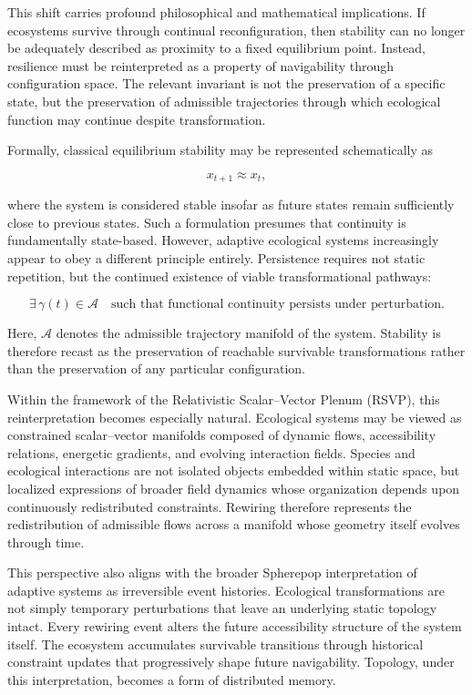 \documentclass[11pt,a4paper]{article}
\newcommand{\Aspace}{\mathcal{A}}
\begin{document}
This shift carries profound philosophical and mathematical implications. If ecosystems survive through continual reconfiguration, then stability can no longer be adequately described as proximity to a fixed equilibrium point. Instead, resilience must be reinterpreted as a property of navigability through configuration space. The relevant invariant is not the preservation of a specific state, but the preservation of admissible trajectories through which ecological function may continue despite transformation.

Formally, classical equilibrium stability may be represented schematically as

\begin{equation}
x_{t+1} \approx x_t, \label{eq:fixedpoint}
\end{equation}

where the system is considered stable insofar as future states remain sufficiently close to previous states. Such a formulation presumes that continuity is fundamentally state-based. However, adaptive ecological systems increasingly appear to obey a different principle entirely. Persistence requires not static repetition, but the continued existence of viable transformational pathways:

\begin{equation}
\exists \, \gamma(t) \in \Aspace
\quad \text{such that functional continuity persists under perturbation.} \label{eq:admissibility}
\end{equation}

Here, $\Aspace$ denotes the admissible trajectory manifold of the system. Stability is therefore recast as the preservation of reachable survivable transformations rather than the preservation of any particular configuration.

Within the framework of the Relativistic Scalar--Vector Plenum (RSVP), this reinterpretation becomes especially natural. Ecological systems may be viewed as constrained scalar--vector manifolds composed of dynamic flows, accessibility relations, energetic gradients, and evolving interaction fields. Species and ecological interactions are not isolated objects embedded within static space, but localized expressions of broader field dynamics whose organization depends upon continuously redistributed constraints. Rewiring therefore represents the redistribution of admissible flows across a manifold whose geometry itself evolves through time.

This perspective also aligns with the broader Spherepop interpretation of adaptive systems as irreversible event histories. Ecological transformations are not simply temporary perturbations that leave an underlying static topology intact. Every rewiring event alters the future accessibility structure of the system itself. The ecosystem accumulates survivable transitions through historical constraint updates that progressively shape future navigability. Topology, under this interpretation, becomes a form of distributed memory.
\end{document}
